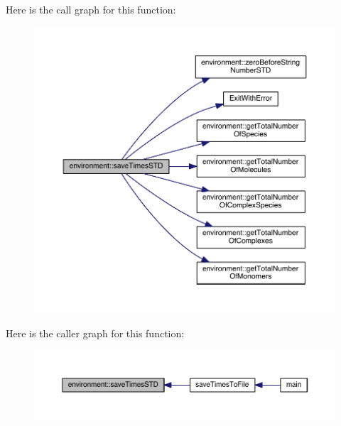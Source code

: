 Here is the call graph for this function\-:
\nopagebreak
\begin{figure}[H]
\begin{center}
\leavevmode
\includegraphics[width=350pt]{a00014_a73e83c4fcfe612514714a6692270351e_cgraph}
\end{center}
\end{figure}




Here is the caller graph for this function\-:
\nopagebreak
\begin{figure}[H]
\begin{center}
\leavevmode
\includegraphics[width=350pt]{a00014_a73e83c4fcfe612514714a6692270351e_icgraph}
\end{center}
\end{figure}


